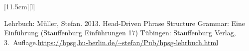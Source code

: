 \newsavebox{\veranstaltungsurl}
 
\newsavebox{\veranstaltungsbuch}
\savebox{\veranstaltungsbuch}[11.5cm][l]{%
\parbox{11.5cm}{\raggedright Lehrbuch: \newline Müller, Stefan. 2013. Head-Driven Phrase Structure Grammar:
  Eine Einführung (Stauffenburg Einführungen 17) Tübingen: Stauffenburg Verlag, 3.\ Auf\/lage.\newline\url{https://hpsg.hu-berlin.de/~stefan/Pub/hpsg-lehrbuch.html}\bigskip\newline~\medskip{}}}

%



